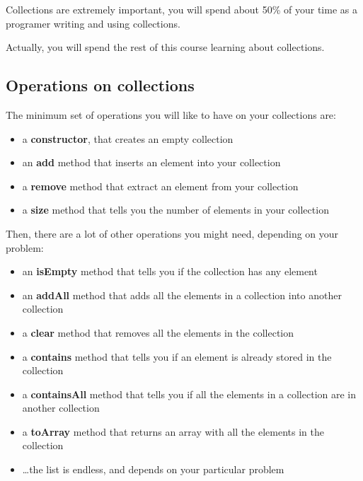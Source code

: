 \documentclass[a4paper, 9pt]{extarticle}
\begin{document}
Collections are extremely important, you will spend about 50\% of your time as a programer writing and using collections.

Actually, you will spend the rest of this course learning about collections.






\subsection{Operations on collections}

The minimum set of operations you will like to have on your collections are:

\begin{itemize}

  \item a \textbf{constructor}, that creates an empty collection

  \item an \textbf{add} method that inserts an element into your collection

  \item a \textbf{remove} method that extract an element from your collection

  \item a \textbf{size} method that tells you the number of elements in your collection

\end{itemize}

Then, there are a lot of other operations you might need, depending on your problem:

\begin{itemize}

  \item an \textbf{isEmpty} method that tells you if the collection has any element

  \item an \textbf{addAll} method that adds all the elements in a collection into another collection

  \item a \textbf{clear} method that removes all the elements in the collection

  \item a \textbf{contains} method that tells you if an element is already stored in the collection

  \item a \textbf{containsAll} method that tells you if all the elements in a collection are in another collection

  \item a \textbf{toArray} method that returns an array with all the elements in the collection

  \item \ldots the list is endless, and depends on your particular problem

\end{itemize}
\end{document}
